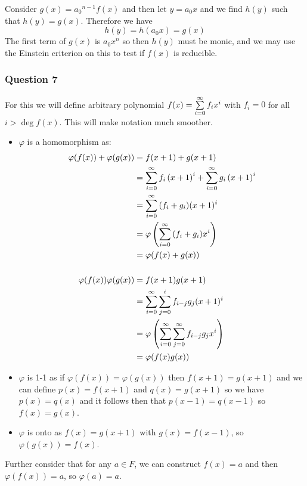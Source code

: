 \documentclass{article}
\begin{document}
Consider $g(x) = {a_0}^{n-1}f(x)$ and then let $y = a_0x$ and we find $h(y)$ such that $h(y) = g(x)$. Therefore we have $$h(y) = h(a_0x) = g(x)$$ The first term of $g(x)$ is ${a_0x}^n$ so then $h(y)$ must be monic, and we may use the Einstein criterion on this to test if $f(x)$ is reducible.


\subsubsection{Question 7}
For this we will define arbitrary polynomial $f(x) = \sum\limits_{i=0}^{\infty}  {f_ix^i} $ with $f_i = 0$ for all $i > \deg f(x)$. This will make notation much smoother.

\begin{itemize}
	\item $\varphi$ is a homomorphism as: \begin{align*}
	\varphi(f(x)) +\varphi(g(x)) &= f(x+1)+g(x+1) \\
	&= \sum\limits_{i=0}^{\infty}  {f_i\left(x+1\right)^i} +\sum\limits_{i=0}^{\infty}  {g_i\left(x+1\right)^i}  \\
	&= \sum\limits_{i=0}^{\infty}  {(f_i+g_i)(x+1)^i}  \\
	&= \varphi\left(\sum\limits_{i=0}^{\infty}  {(f_i+g_i)x^i} \right)\\
	&=\varphi(f(x)+g(x))\\
	\\
	\varphi(f(x))\varphi(g(x)) &= f(x+1)g(x+1) \\
	&= \sum\limits_{i=0}^{\infty}  {\sum\limits_{j=0}^{i}  {f_{i-j}g_j} (x+1)^i}  \\
	&= \varphi\left(\sum\limits_{i=0}^{\infty}  {\sum\limits_{j=0}^{\infty}  {f_{i-j}g_j}  x^i} \right) \\
	&= \varphi(f(x)g(x))
	\end{align*}
	\item $\varphi$ is 1-1 as if $\varphi(f(x)) = \varphi(g(x))$ then $f(x+1)=g(x+1)$ and we can define $p(x) = f(x+1)$ and $q(x) = g(x+1)$ so we have $p(x) = q(x)$ and it follows then that $p(x-1) = q(x-1)$ so $f(x)=g(x)$.
	
	\item $\varphi$ is onto as $f(x) = g(x+1)$ with $g(x) = f(x-1)$, so $\varphi(g(x)) = f(x)$.
\end{itemize}

Further consider that for any $a\in F$, we can construct $f(x) = a$ and then $\varphi(f(x)) = a$, so $\varphi(a) = a$.
\end{document}
